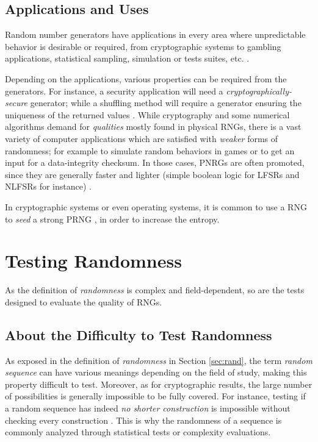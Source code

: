 \documentclass{llncs}
\begin{document}
\subsection{Applications and Uses}

Random number generators have applications in every area where unpredictable behavior is desirable or required, from cryptographic systems to gambling applications, statistical sampling, simulation or tests suites, etc. \cite{w-rng,ray:and}.

Depending on the applications, various properties can be required from the generators. For instance, a security application will need a \emph{cryptographically-secure} generator; while a shuffling method will require a generator ensuring the uniqueness of the returned values \cite{w-rng}. While cryptography and some numerical algorithms demand for \emph{qualities} mostly found in physical RNGs, there is a vast variety of computer applications which are satisfied with \emph{weaker} forms of randomness; for example to simulate random behaviors in games or to get an input for a data-integrity checksum. In those cases, PNRGs are often promoted, since they are generally faster and lighter (simple boolean logic for LFSRs and NLFSRs for instance) \cite{w-rng,ray:and}.

In cryptographic systems or even operating systems, it is common to use a RNG to \emph{seed} a strong PRNG \cite{auma}, in order to increase the entropy.


\section{Testing Randomness}
\label{sec:test}

As the definition of \emph{randomness} is complex and field-dependent, so are the tests designed to evaluate the quality of RNGs.
 
\subsection{About the Difficulty to Test Randomness}

As exposed in the definition of \textit{randomness} in Section \ref{sec:rand}, the term \textit{random sequence} can have various meanings depending on the field of study, making this property difficult to test. Moreover, as for cryptographic results, the large number of possibilities is generally impossible to be fully covered. For instance, testing if a random sequence has indeed \textit{no shorter construction} is impossible without checking every construction \cite{ritt}. 
This is why the randomness of a sequence is commonly analyzed through statistical tests or complexity evaluations.
\end{document}
